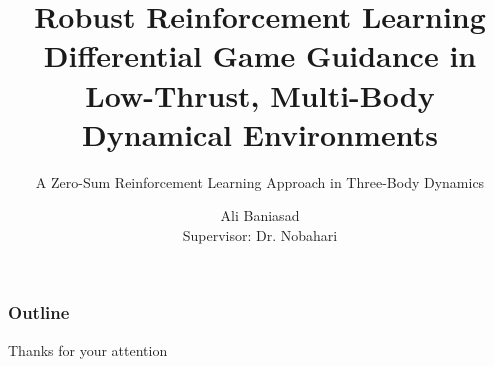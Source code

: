 \documentclass[
    11pt, %
    aspectratio=169, %
]{beamer}
\title[Multi-Agent RL for Spacecraft Guidance]{Robust Reinforcement Learning Differential Game Guidance in Low-Thrust, Multi-Body Dynamical Environments}
\subtitle{A Zero-Sum Reinforcement Learning Approach in Three-Body Dynamics}
\author[Ali Baniasad]{Ali Baniasad \\ \smallskip Supervisor: Dr. Nobahari}
\institute[]{Department of Aerospace Engineering \\ \smallskip Sharif University of Technology}
\date[\today]
\begin{document}
\section{}
\begin{frame}
	\titlepage %

\end{frame}


\begin{frame}
	\frametitle{Outline}
	\tableofcontents
\end{frame}









\appendix
\begin{frame}
  \centering
  {\LARGE Thanks for your attention}
\end{frame}

\end{document}
